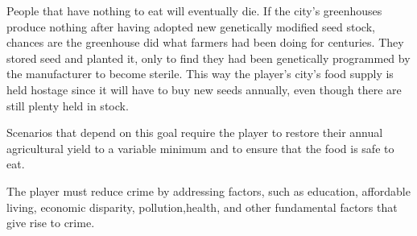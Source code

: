 People that have nothing to eat will eventually die. If the city's greenhouses produce nothing after having adopted new genetically modified seed stock, chances are the greenhouse did what farmers had been doing for centuries. They stored seed and planted it, only to find they had been genetically programmed by the manufacturer to become sterile. This way the player's city's food supply is held hostage since it will have to buy new seeds annually, even though there are still plenty held in stock.

Scenarios that depend on this goal require the player to restore their annual agricultural yield to a variable minimum and to ensure that the food is safe to eat.


The player must reduce crime by addressing factors, such as education, affordable living, economic disparity, pollution,\footnotecite[drum2013] health, and other fundamental factors that give rise to crime.

